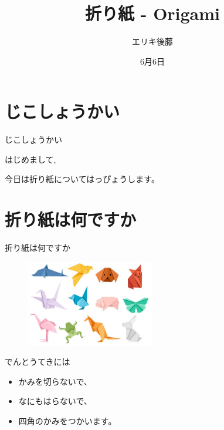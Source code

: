 \documentclass{beamer}
\author{エリキ後藤}
\title{折り紙 - Origami}
\subtitle{}
\institute{UNICAMP}
\date{6月6日}
\begin{document}
\kaishu
\begin{frame}
    \titlepage
\end{frame}

\section{じこしょうかい}
\begin{frame}{じこしょうかい}
    \begin{flushleft}
    \Huge
        はじめまして,
    \end{flushleft}
    \Large
    \begin{flushright}
        今日は折り紙についてはっぴょうします。
    \end{flushright}
\end{frame}

\section{折り紙は何ですか}
\begin{frame}{折り紙は何ですか}

	\begin{figure}
			\includegraphics[width=0.5\textwidth]{a.png}
	\end{figure}
	でんとうてきには
	\begin{itemize}
		\item かみを切らないで、
		\item なにもはらないで、
		\item 四角のかみをつかいます。
	\end{itemize}
\end{frame}
\end{document}
